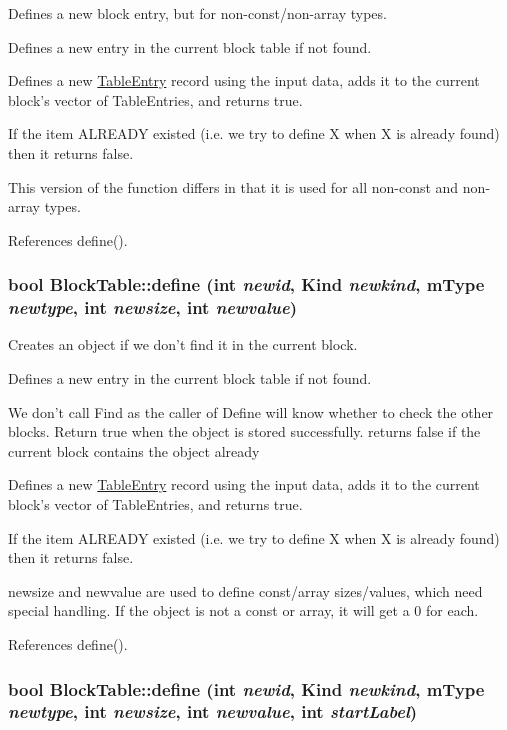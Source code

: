 Defines a new block entry, but for non-\/const/non-\/array types. 

Defines a new entry in the current block table if not found.

Defines a new \hyperlink{structTableEntry}{TableEntry} record using the input data, adds it to the current block's vector of TableEntries, and returns true.

If the item ALREADY existed (i.e. we try to define X when X is already found) then it returns false.

This version of the function differs in that it is used for all non-\/const and non-\/array types. 

References define().

\hypertarget{classBlockTable_a52cc3e2d77fb52b3360b224b671ea6be}{
\subsubsection[{define}]{\setlength{\rightskip}{0pt plus 5cm}bool BlockTable::define (int {\em newid}, \/  {\bf Kind} {\em newkind}, \/  {\bf mType} {\em newtype}, \/  int {\em newsize}, \/  int {\em newvalue})}}
\label{classBlockTable_a52cc3e2d77fb52b3360b224b671ea6be}


Creates an object if we don't find it in the current block. 

Defines a new entry in the current block table if not found.

We don't call Find as the caller of Define will know whether to check the other blocks. Return true when the object is stored successfully. returns false if the current block contains the object already

Defines a new \hyperlink{structTableEntry}{TableEntry} record using the input data, adds it to the current block's vector of TableEntries, and returns true.

If the item ALREADY existed (i.e. we try to define X when X is already found) then it returns false.

newsize and newvalue are used to define const/array sizes/values, which need special handling. If the object is not a const or array, it will get a 0 for each. 

References define().

\hypertarget{classBlockTable_a55f1008e44189505a5ba66d50daa60d5}{
\subsubsection[{define}]{\setlength{\rightskip}{0pt plus 5cm}bool BlockTable::define (int {\em newid}, \/  {\bf Kind} {\em newkind}, \/  {\bf mType} {\em newtype}, \/  int {\em newsize}, \/  int {\em newvalue}, \/  int {\em startLabel})}}
\label{classBlockTable_a55f1008e44189505a5ba66d50daa60d5}


